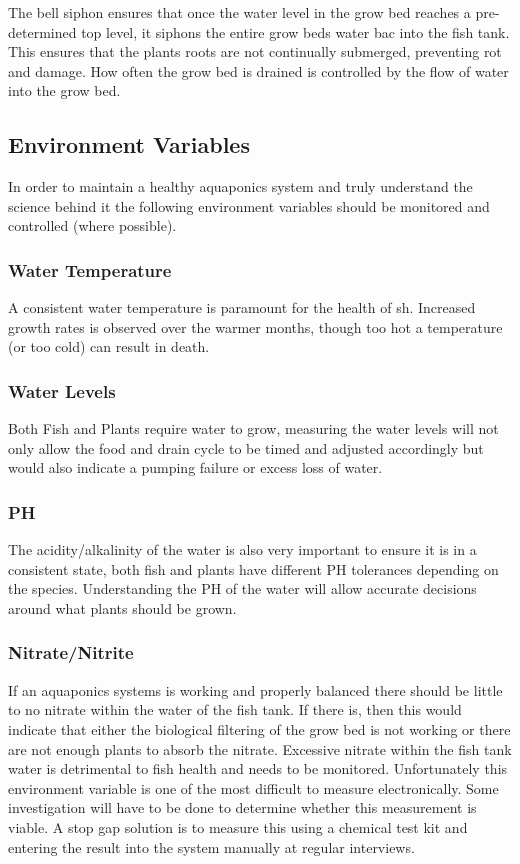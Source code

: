 \documentclass[11pt, oneside, a4paper, titlepage]{article}
\begin{document}
The bell siphon ensures that once the water level in the grow bed reaches a pre-determined top level, it siphons the entire grow beds water bac into the fish tank. This ensures that the plants roots are not continually submerged, preventing rot and damage. How often the grow bed is drained is controlled by the flow of water into the grow bed.  

\subsection{Environment Variables}
In order to maintain a healthy aquaponics system and truly understand the science behind it the following environment variables should be monitored and controlled (where possible). 

\subsubsection{Water Temperature}
A consistent water temperature is paramount for the health of sh. Increased growth rates is observed over the warmer months, though too hot a temperature (or too cold) can result in death. 

\subsubsection{Water Levels}
Both Fish and Plants require water to grow, measuring the water levels will not only allow the food and drain cycle to be timed and adjusted accordingly but would also indicate a pumping failure or excess loss of water. 

\subsubsection{PH}
The acidity/alkalinity of the water is also very important to ensure it is in a consistent state, both fish and plants have different PH tolerances depending on the species. Understanding the PH of the water will allow accurate decisions around what plants should be grown. 

\subsubsection{Nitrate/Nitrite}
If an aquaponics systems is working and properly balanced there should be little to no nitrate within the water of the fish tank. If there is, then this would indicate that either the biological filtering of the grow bed is not working or there are not enough plants to absorb the nitrate. Excessive nitrate within the fish tank water is detrimental to fish health and needs to be monitored. Unfortunately this environment variable is one of the most difficult to measure electronically. Some investigation will have to be done to determine whether this measurement is viable. A stop gap solution is to measure this using a chemical test kit and entering the result into the system manually at regular interviews. 
\end{document}
